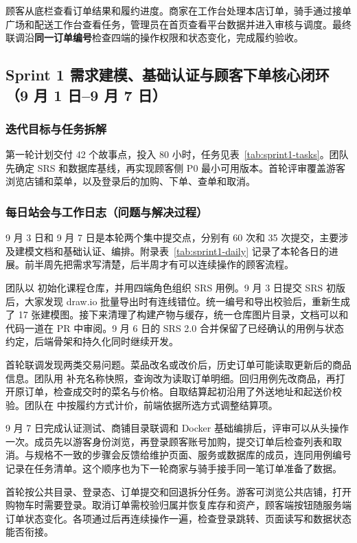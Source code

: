 顾客从底栏查看订单结果和履约进度。商家在工作台处理本店订单，骑手通过接单广场和配送工作台查看任务，管理员在首页查看平台数据并进入审核与调度。最终联调沿\textbf{同一订单编号}检查四端的操作权限和状态变化，完成履约验收。

\subsection{Sprint 1 需求建模、基础认证与顾客下单核心闭环（9 月 1 日--9 月 7 日）}

\subsubsection{迭代目标与任务拆解}
第一轮计划交付 42 个故事点，投入 80 小时，任务见表~\ref{tab:sprint1-tasks}。团队先确定 SRS 和数据库基线，再实现顾客侧 P0 最小可用版本。首轮评审覆盖游客浏览店铺和菜单，以及登录后的加购、下单、查单和取消。

\subsubsection{每日站会与工作日志（问题与解决过程）}
9 月 3 日和 9 月 7 日是本轮两个集中提交点，分别有 60 次和 35 次提交，主要涉及建模文档和基础认证、编排。附录表~\ref{tab:sprint1-daily} 记录了本轮各日的进展。前半周先把需求写清楚，后半周才有可以连续操作的顾客流程。

团队以  初始化课程仓库，并用四端角色组织 SRS 用例。9 月 3 日提交 SRS 初版  后，大家发现 draw.io 批量导出时有连线错位。统一编号和导出校验后，重新生成了 17 张建模图。接下来清理了构建产物与缓存，统一仓库图片目录，文档可以和代码一道在 PR 中审阅。9 月 6 日的 SRS 2.0 合并保留了已经确认的用例与状态约定，后端骨架和持久化同时继续开发。

首轮联调发现两类交易问题。菜品改名或改价后，历史订单可能读取更新后的商品信息。团队用  补充名称快照，查询改为读取订单明细。回归用例先改商品，再打开原订单，检查成交时的菜名与价格。自取结算起初沿用了外送地址和起送价校验。团队在  中按履约方式计价，前端依据所选方式调整结算项。

9 月 7 日完成认证测试、商铺目录联调和 Docker 基础编排后，评审可以从头操作一次。成员先以游客身份浏览，再登录顾客账号加购，提交订单后检查列表和取消。与规格不一致的步骤会反馈给维护页面、服务或数据库的成员，连同用例编号记录在任务清单。这个顺序也为下一轮商家与骑手接手同一笔订单准备了数据。

首轮按公共目录、登录态、订单提交和回退拆分任务。游客可浏览公共店铺，打开购物车时需要登录。取消订单需校验归属并恢复库存和资产，顾客端按钮随服务端订单状态变化。各项通过后再连续操作一遍，检查登录跳转、页面读写\mbox{和数据状态能否衔接}。

